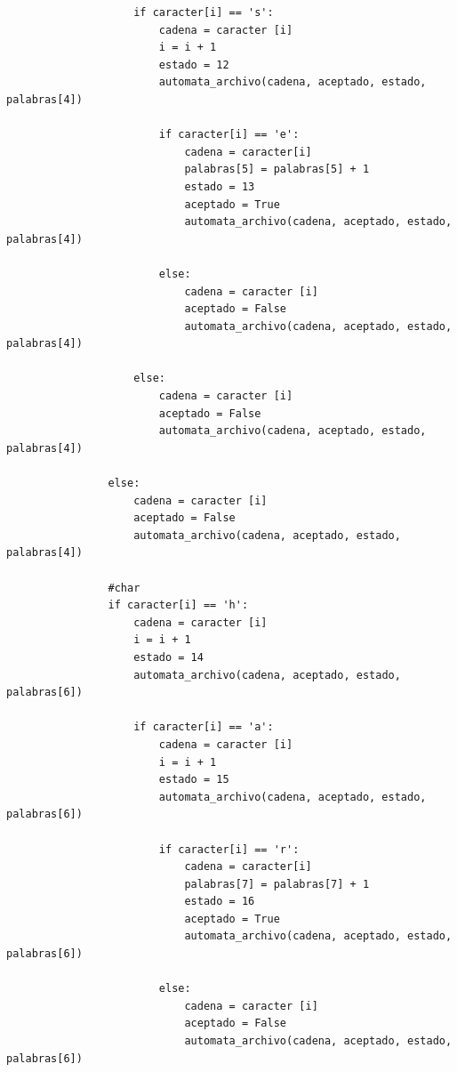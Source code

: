 \documentclass{article}
\begin{document}
\begin{flushleft}
\begin{lstlisting}
                    if caracter[i] == 's':
                        cadena = caracter [i]
                        i = i + 1
                        estado = 12
                        automata_archivo(cadena, aceptado, estado, palabras[4])
                        
                        if caracter[i] == 'e':
                            cadena = caracter[i]
                            palabras[5] = palabras[5] + 1
                            estado = 13
                            aceptado = True
                            automata_archivo(cadena, aceptado, estado, palabras[4])
                            
                        else:
                            cadena = caracter [i]
                            aceptado = False
                            automata_archivo(cadena, aceptado, estado, palabras[4])
                            
                    else:
                        cadena = caracter [i]
                        aceptado = False
                        automata_archivo(cadena, aceptado, estado, palabras[4])
                
                else:
                    cadena = caracter [i]
                    aceptado = False
                    automata_archivo(cadena, aceptado, estado, palabras[4])
                    
                #char    
                if caracter[i] == 'h':
                    cadena = caracter [i]
                    i = i + 1
                    estado = 14
                    automata_archivo(cadena, aceptado, estado, palabras[6])   
                    
                    if caracter[i] == 'a':
                        cadena = caracter [i]
                        i = i + 1
                        estado = 15
                        automata_archivo(cadena, aceptado, estado, palabras[6])
                        
                        if caracter[i] == 'r':
                            cadena = caracter[i]
                            palabras[7] = palabras[7] + 1
                            estado = 16
                            aceptado = True
                            automata_archivo(cadena, aceptado, estado, palabras[6])
                            
                        else:
                            cadena = caracter [i]
                            aceptado = False
                            automata_archivo(cadena, aceptado, estado, palabras[6])
                            

\end{lstlisting}
\end{flushleft}
\end{document}
